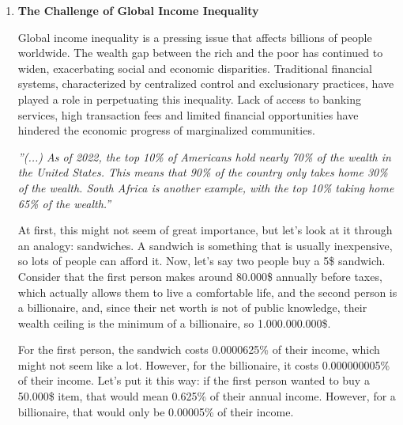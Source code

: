\begin{enumerate}
    \item \textbf{The Challenge of Global Income Inequality}

Global income inequality is a pressing issue that affects billions of people worldwide. The wealth gap between the rich and the poor has continued to widen, exacerbating social and economic disparities. Traditional financial systems, characterized by centralized control and exclusionary practices, have played a role in perpetuating this inequality. Lack of access to banking services, high transaction fees and limited financial opportunities have hindered the economic progress of marginalized communities.

\begin{flushright}
   \textsl{''(...) As of 2022, the top 10\% of Americans hold nearly 70\% of the wealth in the United States. This means that 90\% of the country only takes home 30\% of the wealth. South Africa is another example, with the top 10\% taking home 65\% of the wealth.'' \cite{coint}} \\
\end{flushright}

At first, this might not seem of great importance, but let's look at it through an analogy: sandwiches. A sandwich is something that is usually inexpensive, so lots of people can afford it. Now, let's say two people buy a 5\$ sandwich. Consider that the first person makes around 80.000\$ annually before taxes, which actually allows them to live a comfortable life, and the second person is a billionaire, and, since their net worth is not of public knowledge, their wealth ceiling is the minimum of a billionaire, so 1.000.000.000\$.\newline

For the first person, the sandwich costs 0.0000625\% of their income, which might not seem like a lot. However, for the billionaire, it costs 0.000000005\% of their income. Let's put it this way: if the first person wanted to buy a 50.000\$ item, that would mean 0.625\% of their annual income. However, for a billionaire, that would only be 0.00005\% of their income.\newline


\end{enumerate}
